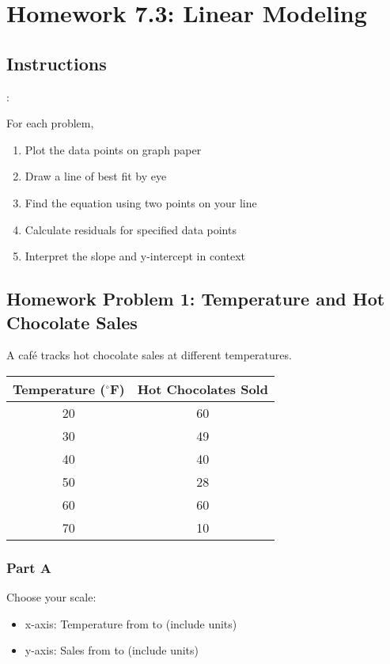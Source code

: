 \documentclass[12pt]{article}
\begin{document}
			\newpage

	\section*{Homework 7.3: Linear Modeling}

		\subsection*{Instructions}:
			
			For each problem,
			\begin{enumerate}
				\item Plot the data points on graph paper
				\item Draw a line of best fit by eye
				\item Find the equation using two points on your line
				\item Calculate residuals for specified data points
				\item Interpret the slope and y-intercept in context
			\end{enumerate}

			\newpage

		\subsection*{Homework Problem 1: Temperature and Hot Chocolate Sales}

			A café tracks hot chocolate sales at different temperatures.

			\begin{center}
				\begin{tabular}{|c|c|}
					\hline
					Temperature ($^\circ$F) & Hot Chocolates Sold \\
					\hline
					20 & 60 \\
					30 & 49 \\
					40 & 40 \\
					50 & 28 \\
					60 & 60 \\
					70 & 10 \\
					\hline
				\end{tabular}
			\end{center}

			\subsubsection*{Part A}

				Choose your scale:
				\begin{itemize}
					\item x-axis: Temperature from \underline{\hspace{1in}} to \underline{\hspace{1in}} (include units)
					\item y-axis: Sales from \underline{\hspace{1in}} to \underline{\hspace{1in}} (include units)
				\end{itemize}
\end{document}
